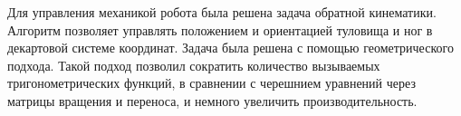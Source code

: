 Для управления механикой робота была решена задача обратной кинематики. Алгоритм позволяет управлять положением и ориентацией туловища и ног в декартовой системе координат. Задача была решена с помощью геометрического подхода. Такой подход позволил сократить количество вызываемых тригонометрических функций, в сравнении с черешнием уравнений через матрицы вращения и переноса, и немного увеличить производительность. 